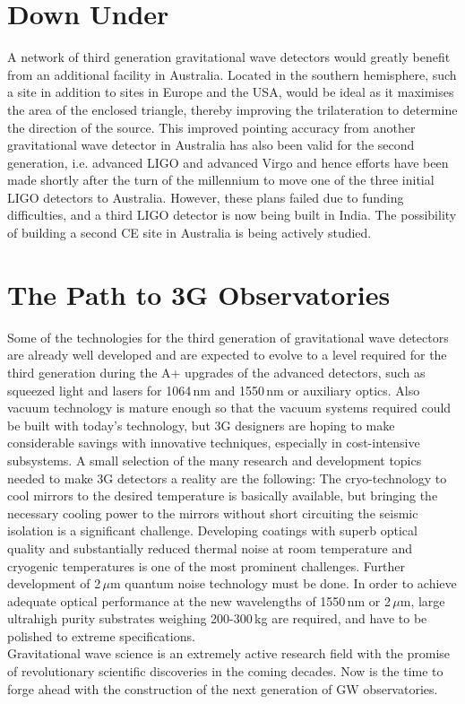 \documentclass[graybox, nosecnum]{svmult}
\begin{document}
\section{Down Under} %
A network of third generation gravitational wave detectors would greatly benefit from an additional facility in Australia. Located in the southern hemisphere, such a site in addition to sites in Europe and the USA, would be ideal as it maximises the area of the enclosed triangle, thereby improving the trilateration to determine the direction of the source.
This improved pointing accuracy from another gravitational wave detector in Australia has also been valid for the second generation, i.e. advanced LIGO and advanced Virgo and hence efforts have been made shortly after the turn of the millennium to move one of the three initial LIGO detectors to Australia. However, these plans failed due to funding difficulties, and a third LIGO detector is now being built in India. The possibility of building a second CE site in Australia is being actively studied.

\section{The Path to 3G Observatories}
Some of the technologies for the third generation of gravitational wave detectors are already well developed and are expected to evolve to a level required for the third generation during the A+ upgrades of the advanced detectors, such as squeezed light and lasers for 1064\,nm and 1550\,nm or auxiliary optics. Also vacuum technology is mature enough so that the vacuum systems required could be built with today's technology, but 3G designers are hoping to make considerable savings with innovative techniques, especially in cost-intensive subsystems. 
A small selection of the many research and development topics needed to make 3G detectors a reality are the following:
The cryo-technology to cool mirrors to the desired temperature is basically available, but bringing the necessary cooling power to the mirrors without short circuiting the seismic isolation is a significant challenge. Developing coatings with superb optical quality and substantially reduced thermal noise at room temperature and cryogenic temperatures is one of the most prominent challenges. Further development of 2\,$\mu$m quantum noise technology must be done. In order to achieve adequate optical performance at the new wavelengths of 1550\,nm or 2\,$\mu$m, large ultrahigh purity substrates weighing 200-300\,kg are required, and have to be polished to extreme specifications. 
\\

Gravitational wave science is an extremely active research field with the promise of revolutionary scientific discoveries in the coming decades. Now is the time to forge ahead with the construction of the next generation of GW observatories. 


\end{document}
